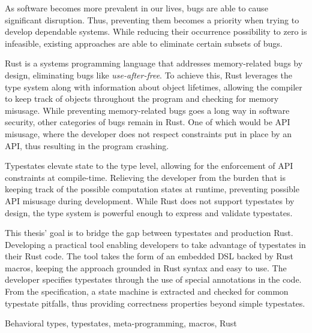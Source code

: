 
As software becomes more prevalent in our lives, bugs are able to cause significant disruption.
Thus, preventing them becomes a priority when trying to develop dependable systems.
While reducing their occurrence possibility to zero is infeasible,
existing approaches are able to eliminate certain subsets of bugs.

Rust is a systems programming language that addresses memory-related bugs by design,
eliminating bugs like \emph{use-after-free}.
To achieve this, Rust leverages the type system along with information about object lifetimes,
allowing the compiler to keep track of objects throughout the program and checking for memory misusage.
While preventing memory-related bugs goes a long way in software security, other categories of bugs remain in Rust.
One of which would be API misusage, where the developer does not respect constraints put in place by an API,
thus resulting in the program crashing.

Typestates elevate state to the type level, allowing for the enforcement of API constraints at compile-time.
Relieving the developer from the burden that is keeping track of the possible computation states at runtime,
preventing possible API misusage during development.
While Rust does not support typestates by design,
the type system is powerful enough to express and validate typestates.

This thesis' goal is to bridge the gap between typestates and production Rust.
Developing a practical tool enabling developers to take advantage of typestates in their Rust code.
The tool takes the form of an embedded DSL backed by Rust macros,
keeping the approach grounded in Rust syntax and easy to use.
The developer specifies typestates through the use of special annotations in the code.
From the specification, a state machine is extracted and checked for common typestate pitfalls,
thus providing correctness properties beyond simple typestates.


\begin{keywords}
Behavioral types, typestates, meta-programming, macros, Rust
\end{keywords}
